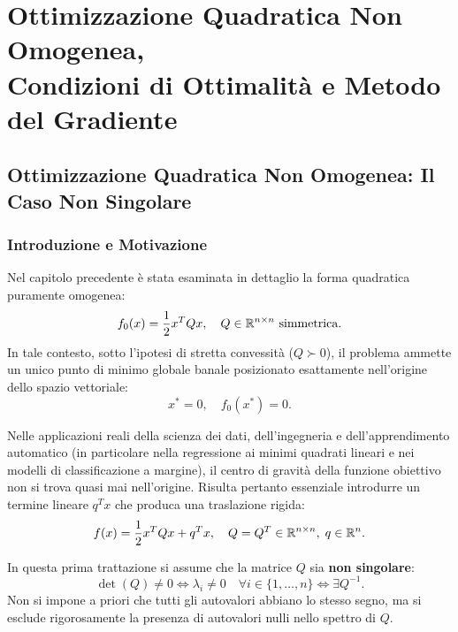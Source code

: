 \chapter[Ottimizzazione Quadratica Non Omogenea e GMQ]{Ottimizzazione Quadratica Non Omogenea,\\Condizioni di Ottimalit\`a e Metodo del Gradiente}
\label{chap:ottimizzazione-quadratica-non-omogenea-gmq}

\FloatBarrier
\section{Ottimizzazione Quadratica Non Omogenea: Il Caso Non Singolare}
\label{sec:quadratica-non-omogenea-non-singolare}

\subsection{Introduzione e Motivazione}
Nel capitolo precedente \`e stata esaminata in dettaglio la forma quadratica puramente omogenea:
\begin{equation}
    f_0(x) = \frac{1}{2} x^T Q x, \quad Q \in \mathbb{R}^{n \times n} \text{ simmetrica}.
\end{equation}
In tale contesto, sotto l'ipotesi di stretta convessit\`a ($Q \succ 0$), il problema ammette un unico punto di minimo globale banale posizionato esattamente nell'origine dello spazio vettoriale:
\begin{equation}
    x^* = 0, \quad f_0(x^*) = 0.
\end{equation}

Nelle applicazioni reali della scienza dei dati, dell'ingegneria e dell'apprendimento automatico (in particolare nella regressione ai minimi quadrati lineari e nei modelli di classificazione a margine), il centro di gravit\`a della funzione obiettivo non si trova quasi mai nell'origine. Risulta pertanto essenziale introdurre un termine lineare $q^T x$ che produca una traslazione rigida:
\begin{equation}
    f(x) = \frac{1}{2} x^T Q x + q^T x, \quad Q = Q^T \in \mathbb{R}^{n \times n}, \; q \in \mathbb{R}^n.
    \label{eq:quadratica-non-omogenea}
\end{equation}

In questa prima trattazione si assume che la matrice $Q$ sia \textbf{non singolare}:
\begin{equation}
    \det(Q) \neq 0 \iff \lambda_i \neq 0 \quad \forall i \in \{1, \dots, n\} \iff \exists Q^{-1}.
\end{equation}
Non si impone a priori che tutti gli autovalori abbiano lo stesso segno, ma si esclude rigorosamente la presenza di autovalori nulli nello spettro di $Q$.


